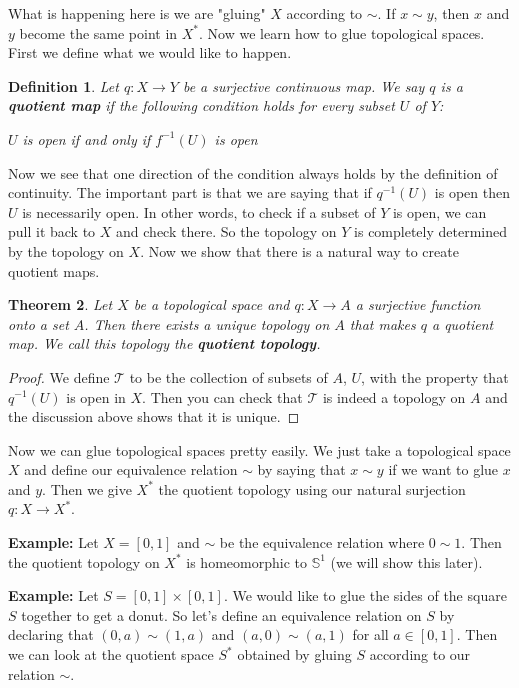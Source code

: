 \documentclass[a4paper]{article}
\newtheorem{theorem}{Theorem}
\newtheorem{definition}[theorem]{Definition}
\numberwithin{theorem}{section}
\begin{document}
What is happening here is we are "gluing" $X$ according to $\sim$. If $x\sim y$, then $x$ and $y$ become the same point in $X^*$. Now we learn how to glue topological spaces. First we define what we would like to happen.

\begin{definition}
Let $q: X \rightarrow Y$ be a surjective continuous map. We say $q$ is a \textbf{quotient map} if the following condition holds for every subset $U$ of $Y$:
\begin{center}
$U$ is open if and only if $f^{-1}(U)$ is open
\end{center}
\end{definition}

Now we see that one direction of the condition always holds by the definition of continuity. The important part is that we are saying that if $q^{-1}(U)$ is open then $U$ is necessarily open. In other words, to check if a subset of $Y$ is open, we can pull it back to $X$ and check there. So the topology on $Y$ is completely determined by the topology on $X$. Now we show that there is a natural way to create quotient maps.

\begin{theorem}
Let $X$ be a topological space and $q: X \rightarrow A$ a surjective function onto a set $A$. Then there exists a unique topology on $A$ that makes $q$ a quotient map. We call this topology the \textbf{quotient topology}.
\end{theorem}

\begin{proof}
We define $\mathcal{T}$ to be the collection of subsets of $A$, $U$, with the property that $q^{-1}(U)$ is open in $X$. Then you can check that $\mathcal{T}$ is indeed a topology on $A$ and the discussion above shows that it is unique.
\end{proof}

Now we can glue topological spaces pretty easily. We just take a topological space $X$ and define our equivalence relation $\sim$ by saying that $x \sim y$ if we want to glue $x$ and $y$. Then we give $X^*$ the quotient topology using our natural surjection $q: X \rightarrow X^*$.

\textbf{Example:} Let $X = [0,1]$ and $\sim$ be the equivalence relation where $0 \sim 1$. Then the quotient topology on $X^*$ is homeomorphic to $\mathbb{S}^1$ (we will show this later).

\textbf{Example:} Let $S = [0,1] \times [0,1]$. We would like to glue the sides of the square $S$ together to get a donut. So let's define an equivalence relation on $S$ by declaring that $(0,a) \sim (1,a)$ and $(a,0) \sim (a,1)$ for all $a \in [0,1]$. Then we can look at the quotient space $S^*$ obtained by gluing $S$ according to our relation $\sim$.
\end{document}
